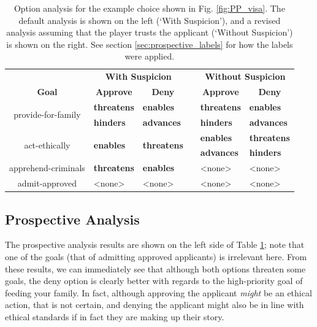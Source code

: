 \documentclass[arts,article,submit,moreauthors,pdftex,10pt,a4paper]{Definitions/mdpi}
\newcommand{\enables}{\textbf{\color{enables}enables}}
\newcommand{\advances}{\textbf{\color{advances}advances}}
\newcommand{\threatens}{\textbf{\color{threatens}threatens}}
\newcommand{\hinders}{\textbf{\color{hinders}hinders}}
\begin{document}
\begin{table}[H]
\centering
\begin{tabular}{c l l l l l}
  \toprule
  & \multicolumn{2}{c}{\textbf{With Suspicion}} && \multicolumn{2}{c}{\textbf{Without Suspicion}} \\
  \cmidrule(r){1-1} \cmidrule{2-3} \cmidrule{5-6}
  \textbf{Goal} & \multicolumn{1}{c}{\textbf{Approve}} & \multicolumn{1}{c}{\textbf{Deny}} && \multicolumn{1}{c}{\textbf{Approve}} & \multicolumn{1}{c}{\textbf{Deny}} \\
  \cmidrule(r){1-1} \cmidrule{2-3} \cmidrule{5-6}
  \multirow{2}{9em}{\centering provide-for-family} & \threatens{} & \enables{} && \threatens{} & \enables{} \\
                                        & \hinders{} & \advances{} && \hinders{} & \advances{} \\
  \cmidrule(r){1-1} \cmidrule{2-3} \cmidrule{5-6}
  \multirow{2}{9em}{\centering act-ethically} & \multirow{2}{6em}{\enables{}} & \multirow{2}{6em}{\threatens{}} && \enables{} & \threatens{} \\
  & & && \advances{} & \hinders{} \\
  \cmidrule(r){1-1} \cmidrule{2-3} \cmidrule{5-6}
  apprehend-criminals & \threatens{} & \enables{} && <none> & <none> \\
  \cmidrule(r){1-1} \cmidrule{2-3} \cmidrule{5-6}
  admit-approved & <none> & <none> && <none> & <none> \\
  \bottomrule
\end{tabular}
  \caption[\emph{Papers Please} option analysis]{Option analysis for the example choice shown in Fig. \ref{fig:PP_visa}. The default analysis is shown on the left (`With Suspicion'), and a revised analysis assuming that the player trusts the applicant (`Without Suspicion') is shown on the right. See section \ref{sec:prospective_labels} for how the labels were applied.}
\label{tab:PP_options}
\end{table}

\subsection{Prospective Analysis}

The prospective analysis results are shown on the left side of Table \ref{tab:PP_options}; note that one of the goals (that of admitting approved applicants) is irrelevant here.
%
From these results, we can immediately see that although both options threaten some goals, the deny option is clearly better with regards to the high-priority goal of feeding your family.
%
In fact, although approving the applicant \emph{might} be an ethical action, that is not certain, and denying the applicant might also be in line with ethical standards if in fact they are making up their story.
\end{document}
